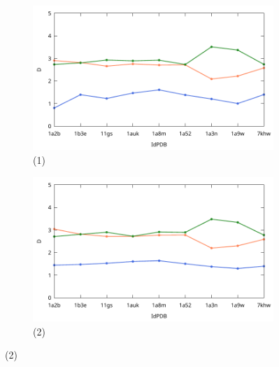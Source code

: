 	\begin{figure}[H]
		\centering
		\begin{subfigure}{0.49\textwidth}
			\centering
			\includegraphics[width=\linewidth,page=1]{graphs/PDBs/Dvsldx/DvsaddH.pdf}
			\caption{(1)}
		\end{subfigure}
		\hfill
		\begin{subfigure}{0.49\textwidth}
			\centering
			\includegraphics[width=\linewidth,page=1]{graphs/PDBs/Dvsldx/DvsEm.pdf}
			\caption{(2)}
		\end{subfigure}
		
		\vspace{0.3cm}
		

\end{figure}
